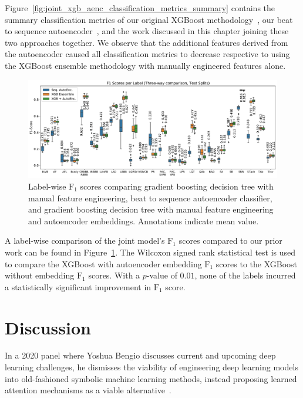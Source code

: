 \documentclass[\main/thesis.tex]{subfiles}
\begin{document}
Figure~\ref{fig:joint_xgb_aenc_classification_metrics_summary} contains the summary classification metrics of our original XGBoost methodology~\cite{wong2020CINC-multilabel-ECG}, our beat to sequence autoencoder~\cite{wong2021ICASSP-multilabel-ECG}, and the work discussed in this chapter joining these two approaches together.
We observe that the additional features derived from the autoencoder caused all classification metrics to decrease respective to using the XGBoost ensemble methodology with manually engineered features alone.

\begin{figure}[ht]
    \centering
    \includegraphics[width=14cm]{figure/label_f1s_3_way.pdf}
    \caption[Label-wise $\text{F}_1$ scores comparing gradient boosting decision tree with manual feature engineering, beat to sequence autoencoder classifier, and gradient boosting decision tree with manual feature engineering and autoencoder embeddings.]{Label-wise $\text{F}_1$ scores comparing gradient boosting decision tree with manual feature engineering, beat to sequence autoencoder classifier, and gradient boosting decision tree with manual feature engineering and autoencoder embeddings. Annotations indicate mean value.}
    \label{fig:joint_xgb_aenc_f1_score}
\end{figure}

A label-wise comparison of the joint model's $\text{F}_1$ scores compared to our prior work can be found in Figure~\ref{fig:joint_xgb_aenc_f1_score}.
The Wilcoxon signed rank statistical test is used to compare the XGBoost with autoencoder embedding $\text{F}_1$ scores to the XGBoost without embedding $\text{F}_1$ scores.
With a $p$-value of $0.01$, none of the labels incurred a statistically significant improvement in $\text{F}_1$ score.

\section{Discussion}
In a 2020 panel where Yoshua Bengio discusses current and upcoming deep learning challenges, he dismisses the viability of engineering deep learning models into old-fashioned symbolic machine learning methods, instead proposing learned attention mechanisms as a viable alternative~\cite{2020-yoshua-dlc}.
\end{document}
